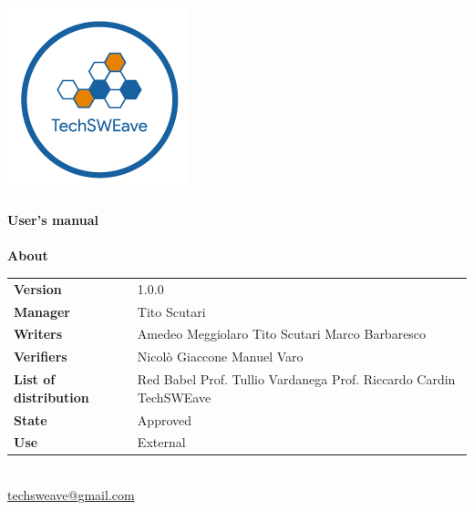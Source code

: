 \documentclass[a4paper]{article}
\begin{document}
\begin{titlepage}
    \begin{center}
        \includegraphics{../../../../Images/logo.png}\\
        \vspace{20px}
        \textcolor{logo}{\hrulefill}\\
        \vspace{20px}
        \textbf{\huge\textcolor{logo}{User's manual}}\\
        \vspace{10px}
        \textcolor{logo}{\hrulefill}\\
        \vspace{40px}
        \textbf{\Large About}\\
        \vspace{20px}
        \begin{tabular}{p{100px} | p{100px}}
            \textbf{Version}              & 1.0.0                                                                                        \\
            \textbf{Manager}              & Tito Scutari                                                                                 \\
            \textbf{Writers}              & Amedeo Meggiolaro \newline Tito Scutari \newline Marco Barbaresco                            \\
            \textbf{Verifiers}            & Nicolò Giaccone \newline Manuel Varo                                                         \\
            \textbf{List of distribution} & Red Babel \newline Prof. Tullio Vardanega \newline Prof. Riccardo Cardin \newline TechSWEave \\
            \textbf{State}                & Approved                                                                                     \\
            \textbf{Use}                  & External                                                                                     \\
        \end{tabular}\\
        \vspace{60px}
        \href{mailto:techsweave@gmail.com}{techsweave@gmail.com}\\


\end{center}
\end{titlepage}
\end{document}
